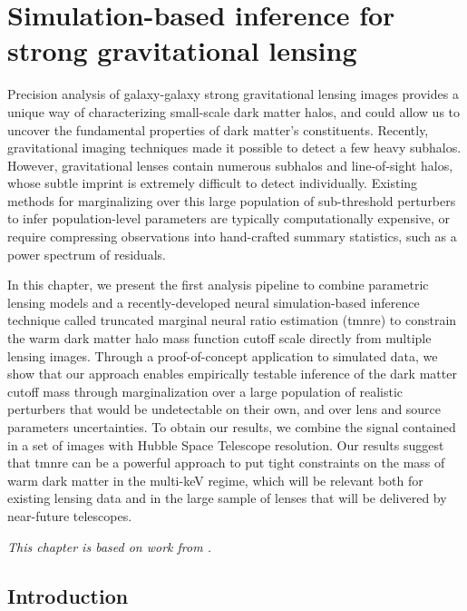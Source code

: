 \chapter{Simulation-based inference for strong gravitational lensing} \label{cha:lensing}


Precision analysis of galaxy-galaxy strong gravitational lensing images provides a unique way of characterizing small-scale dark matter halos, and could allow us to uncover the fundamental properties of dark matter's constituents. Recently, gravitational imaging techniques made it possible to detect a few heavy subhalos. However, gravitational lenses contain numerous subhalos and line-of-sight halos, whose subtle imprint is extremely difficult to detect individually. Existing methods for marginalizing over this large population of sub-threshold perturbers to infer population-level parameters are typically computationally expensive, or require compressing observations into hand-crafted summary statistics, such as a power spectrum of residuals.

In this chapter, we present the first analysis pipeline to combine parametric lensing models and a recently-developed neural simulation-based inference technique called truncated marginal neural ratio estimation (\gls*{tmnre}) to constrain the warm dark matter halo mass function cutoff scale directly from multiple lensing images. Through a proof-of-concept application to simulated data, we show that our approach enables empirically testable inference of the dark matter cutoff mass through marginalization over a large population of realistic perturbers that would be undetectable on their own, and over lens and source parameters uncertainties. To obtain our results, we combine the signal contained in a set of images with Hubble Space Telescope resolution. Our results suggest that \gls*{tmnre} can be a powerful approach to put tight constraints on the mass of warm dark matter in the multi-keV regime, which will be relevant both for existing lensing data and in the large sample of lenses that will be delivered by near-future telescopes.

\textit{This chapter is based on work from \cite{Montel:2022fhv}.}


\section{Introduction} \label{sec:sl-intro}


